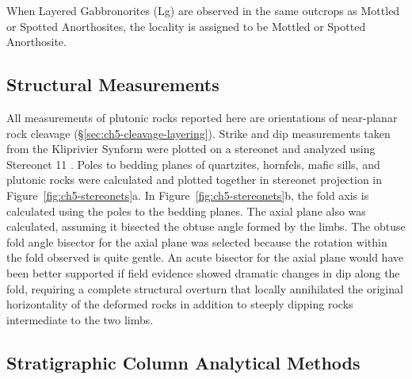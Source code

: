 When Layered Gabbronorites (Lg) are
observed in the same outcrops as Mottled or Spotted Anorthosites, the
locality is assigned to be Mottled or Spotted Anorthosite.

\subsection{Structural Measurements}
\label{sec:ch5-structural-methods}

All measurements of plutonic rocks reported here are orientations of
near-planar rock cleavage (\S\ref{sec:ch5-cleavage-layering}).
Strike and dip measurements taken from the Kliprivier Synform were
plotted on a stereonet and analyzed using Stereonet 11 \citep{allmendinger2012,cardozo2013}. Poles to bedding planes of
quartzites, hornfels, mafic sills, and plutonic rocks were calculated
and plotted together in stereonet projection in Figure~\ref{fig:ch5-stereonets}a. In Figure~\ref{fig:ch5-stereonets}b,
the fold axis is calculated using the poles to the bedding planes. The axial plane also was calculated, assuming it
bisected the obtuse angle formed by the limbs. The obtuse fold angle
bisector for the axial plane was selected because the rotation within
the fold observed is quite gentle. An acute bisector for the axial plane
would have been better supported if field evidence showed dramatic changes
in dip along the fold, requiring a complete structural overturn that
locally annihilated the original horizontality of the deformed rocks in
addition to steeply dipping rocks intermediate to the two limbs.

\subsection{Stratigraphic Column Analytical Methods}\label{sec:ch5-stratigraphic-column-methods}


